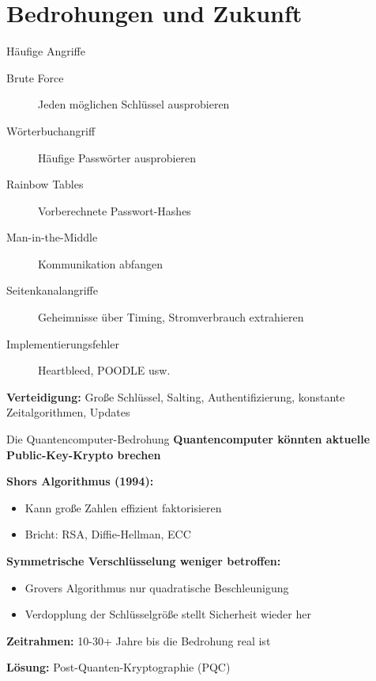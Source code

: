 \documentclass[handout]{beamer}
\begin{document}
\section{Bedrohungen und Zukunft}

\begin{frame}{Häufige Angriffe}
\begin{description}
    \item[Brute Force] Jeden möglichen Schlüssel ausprobieren
    \item[Wörterbuchangriff] Häufige Passwörter ausprobieren
    \item[Rainbow Tables] Vorberechnete Passwort-Hashes
    \item[Man-in-the-Middle] Kommunikation abfangen
    \item[Seitenkanalangriffe] Geheimnisse über Timing, Stromverbrauch extrahieren
    \item[Implementierungsfehler] Heartbleed, POODLE usw.
\end{description}

\vspace{0.3cm}
\textbf{Verteidigung:} Große Schlüssel, Salting, Authentifizierung, konstante Zeitalgorithmen, Updates
\end{frame}

\begin{frame}{Die Quantencomputer-Bedrohung}
\textbf{Quantencomputer könnten aktuelle Public-Key-Krypto brechen}

\vspace{0.3cm}
\textbf{Shors Algorithmus (1994):}
\begin{itemize}
    \item Kann große Zahlen effizient faktorisieren
    \item Bricht: RSA, Diffie-Hellman, ECC
\end{itemize}

\vspace{0.3cm}
\textbf{Symmetrische Verschlüsselung weniger betroffen:}
\begin{itemize}
    \item Grovers Algorithmus nur quadratische Beschleunigung
    \item Verdopplung der Schlüsselgröße stellt Sicherheit wieder her
\end{itemize}

\vspace{0.3cm}
\textbf{Zeitrahmen:} 10-30+ Jahre bis die Bedrohung real ist

\textbf{Lösung:} Post-Quanten-Kryptographie (PQC)

\end{frame}
\end{document}
